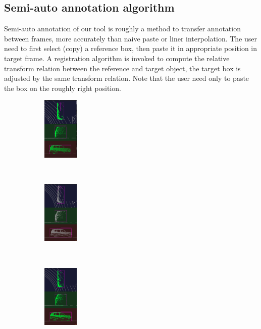 \documentclass[letterpaper, 10 pt, conference]{ieeeconf}  %
\begin{document}
\subsection{Semi-auto annotation algorithm}

Semi-auto annotation of our tool is roughly a method to transfer annotation between frames, more accurately than naive paste or liner interpolation. The user need to first select (copy) a reference box, then paste it in appropriate position in target frame. A registration algorithm is invoked to compute the relative transform relation between the reference and target object, the target box is adjusted by the same transform relation. Note that the user need only to paste the box on the roughly right position.


\begin{figure}[htpb]
	\centering
	\begin{subfigure}[t]{0.18\linewidth}
		\includegraphics[height=3cm]{./figures/reg-ref-3d}\\
		\caption{}\label{fig:box-ref}
	\end{subfigure}\hfill
	~
	\begin{subfigure}[t]{0.18\linewidth}
		\includegraphics[height=3cm]{./figures/reg-input-3d}\\
		\caption{}\label{fig:box-source}
	\end{subfigure}\hfill
	~
	\begin{subfigure}[t]{0.18\linewidth}
		\includegraphics[height=3cm]{./figures/reg-result-3d}\\
		\caption{}\label{fig:box-output}
	\end{subfigure}\hfill
	

\end{figure}
\end{document}
